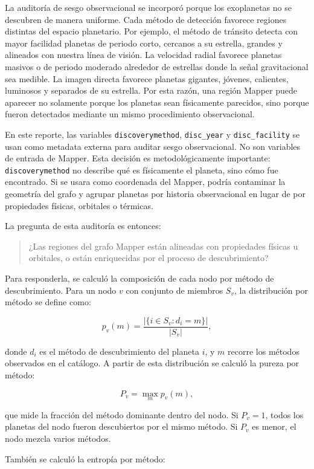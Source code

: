 La auditoría de sesgo observacional se incorporó porque los exoplanetas no se descubren de manera uniforme. Cada método de detección favorece regiones distintas del espacio planetario. Por ejemplo, el método de tránsito detecta con mayor facilidad planetas de periodo corto, cercanos a su estrella, grandes y alineados con nuestra línea de visión. La velocidad radial favorece planetas masivos o de periodo moderado alrededor de estrellas donde la señal gravitacional sea medible. La imagen directa favorece planetas gigantes, jóvenes, calientes, luminosos y separados de su estrella. Por esta razón, una región Mapper puede aparecer no solamente porque los planetas sean físicamente parecidos, sino porque fueron detectados mediante un mismo procedimiento observacional.

En este reporte, las variables \texttt{discoverymethod}, \texttt{disc\_year} y \texttt{disc\_facility} se usan como metadata externa para auditar sesgo observacional. No son variables de entrada de Mapper. Esta decisión es metodológicamente importante: \texttt{discoverymethod} no describe qué es físicamente el planeta, sino cómo fue encontrado. Si se usara como coordenada del Mapper, podría contaminar la geometría del grafo y agrupar planetas por historia observacional en lugar de por propiedades físicas, orbitales o térmicas.

La pregunta de esta auditoría es entonces:

\begin{quote}
¿Las regiones del grafo Mapper están alineadas con propiedades físicas u orbitales, o están enriquecidas por el proceso de descubrimiento?
\end{quote}

Para responderla, se calculó la composición de cada nodo por método de descubrimiento. Para un nodo \(v\) con conjunto de miembros \(S_v\), la distribución por método se define como:

\[
p_v(m)=\frac{|\{i\in S_v : d_i=m\}|}{|S_v|},
\]

donde \(d_i\) es el método de descubrimiento del planeta \(i\), y \(m\) recorre los métodos observados en el catálogo. A partir de esta distribución se calculó la pureza por método:

\[
P_v = \max_m p_v(m),
\]

que mide la fracción del método dominante dentro del nodo. Si \(P_v=1\), todos los planetas del nodo fueron descubiertos por el mismo método. Si \(P_v\) es menor, el nodo mezcla varios métodos.

También se calculó la entropía por método:

